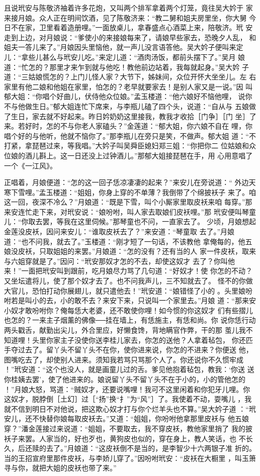 且说玳安与陈敬济袖着许多花炮，又叫两个排军拿着两个灯笼，竟往吴大妗于
家来接月娘。众人正在明间饮酒，见了陈敬济来：“教二舅和姐夫房里坐，你大舅
今日不在家，卫里看着造册哩。”一面放桌儿，拿春盛点心酒菜上来，陪敬济。玳
安走到上边，对月娘说：“爹使小的来接娘每来了，请娘早些家去，恐晚夕人乱，
和姐夫一答儿来了。”月娘因头里恼他，就一声儿没言语答他。吴大妗子便叫来定
儿：“拿些儿甚么与玳安儿吃。”来定儿道：“酒肉汤饭，都前头摆下了。”吴月
娘道：“忙怎的？那里才来乍到就与他吃！教他前边站着，我每就起身。”吴大妗
子道：“三姑娘慌怎的？上门儿怪人家？大节下，姊妹间，众位开怀大坐坐儿。左
右家里有他二娘和他姐在家里，怕怎的？老早就要家去！是别人家又是一说。”因
叫郁大姐：“你唱个好曲儿，伏侍他众位娘。”孟玉楼道：“他六娘好不恼他哩，
说你不与他做生日。”郁大姐连忙下席来，与李瓶儿磕了四个头，说道：“自从与
五娘做了生日，家去就不好起来。昨日妗奶奶这里接我，教我才收拾［门争］［门
坐］了来。若好时，怎的不与你老人家磕头？”金莲道：“郁大姐，你六娘不自在
哩，你唱个好的与他听，他就不恼你了。”那李瓶儿在旁只是笑，不做声。郁大姐
道：“不打紧，拿琵琶过来，等我唱。”大妗子叫吴舜臣媳妇郑三姐：“你把你二
位姑娘和众位娘的酒儿斟上。这一日还没上过钟酒儿。”那郁大姐接琵琶在手，用
心用意唱了一个《一江风》。

正唱着，月娘便道：“怎的这一回子恁凉凄凄的起来？”来安儿在旁说道：“
外边天寒下雪哩。”孟玉楼道：“姐姐，你身上穿的不单薄？我倒带了个绵披袄子
来了。咱这一回，夜深不冷么？”月娘道：“既是下雪，叫个小厮家里取皮袄来咱
每穿。”那来安连忙走下来，对玳安说：“娘吩咐，叫人家去取娘们皮袄哩。”那
玳安便叫琴童儿：“你取去罢，等我在这里伺候。”那琴童也不问，一直家去了。
少顷，月娘想起金莲没皮袄，因问来安儿：“谁取皮袄去了？”来安道：“琴童取
去了。”月娘道：“也不问我，就去了。”玉楼道：“刚才短了一句话，不该教他
拿俺每的，他五娘没皮袄，只取姐姐的来罢。”月娘道：“怎的没有？还有当的人
家一件皮袄，取来与六姐穿就是了。”因问：“玳安那奴才怎的不去，却使这奴才
去了？你叫他来！”一面把玳安叫到跟前，吃月娘尽力骂了几句道：“好奴才！使
你怎的不动？又坐坛遣将儿，使了那个奴才去了。也不问我声儿，三不知就去了。
怪不的你做大官儿，恐怕打动你展翅儿，就只遣他去！”玳安道：“娘错怪了小的
。头里娘吩咐若是叫小的去，小的敢不去？来安下来，只说叫一个家里去。”月娘
道：“那来安小奴才敢吩咐你？俺每恁大老婆，还不敢使你哩！如今惯的你这奴才
们有些摺儿也怎的？一来主子烟薰的佛像──挂在墙上，有恁施主，有恁和尚。你
说你恁行动两头戳舌，献勤出尖儿，外合里应，好懒食馋，背地瞒官作弊，干的那
茧儿我不知道哩！头里你家主子没使你送李桂儿家去，你怎的送他？人拿着毡包，
你还匹手夺过去了。留丫头不留丫头不在你，使你进来说，你怎的不进来？你便送
他，图嘴吃去了，却使别人进来。须知我若骂只骂那个人了。你还说你不久惯牢成
！”玳安道：“这个也没人，就是画童儿过的舌。爹见他抱着毡包，教我：‘你送
送你桂姨去罢’，使了他进来的。娘说留丫头不留丫头不在于小的，小的管他怎的
！”月娘大怒，骂道：“贼奴才，还要说嘴哩！我可不这里闲着和你犯牙儿哩。你
这奴才，脱脖倒［土幻］过［“扬”换“扌”为“风”］了。我使着不动，耍嘴儿
，我就不信到明日不对他说，把这欺心奴才打与你个烂羊头也不算。”吴大妗子道
：“玳安儿，还不快替你娘每取皮袄去。”又道：“姐姐，你吩咐他拿那里皮袄与
他五娘穿？”潘金莲接过来说道：“姐姐，不要取去，我不穿皮袄，教他家里捎了
我的披袄子来罢。人家当的，好也歹也，黄狗皮也似的，穿在身上，教人笑话，也
不长久，后还赎的去了。”月娘道：“这皮袄倒不是当的，是李智少十六两银子准
折的。当的王招宣府里那件皮袄，与李娇儿穿了。”因吩咐玳安：“皮袄在大橱里
，叫玉箫寻与你，就把大姐的皮袄也带了来。”

